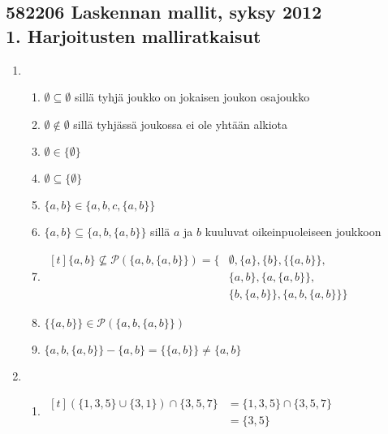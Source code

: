 \documentclass[a4paper,11pt,draft]{article}
\begin{document}
\subsection*{582206 Laskennan mallit, syksy 2012\\
1. Harjoitusten malliratkaisut}

\begin{enumerate}

\item
  \begin{enumerate}
  \item $\emptyset \subseteq \emptyset$ sillä tyhjä joukko on jokaisen
    joukon osajoukko
  \item $\emptyset \notin \emptyset$ sillä tyhjässä joukossa ei ole
    yhtään alkiota
  \item $\emptyset \in \{\emptyset\}$
  \item $\emptyset \subseteq \{\emptyset\}$
  \item $\{a,b\} \in \{a,b,c,\{a,b\}\}$
  \item $\{a,b\} \subseteq \{a,b,\{a,b\}\}$ sillä $a$ ja $b$ kuuluvat
    oikeinpuoleiseen joukkoon

  \item
    \begin{math}
      \begin{aligned}[t]
        \{a,b\} \not\subseteq \mathcal{P}(\{a,b,\{a,b\}\}) =
        \{&\emptyset, \{a\}, \{b\}, \{\{a,b\}\},\\
        &\{a, b\}, \{a, \{a, b\}\},\\
        &\{b, \{a, b\}\}, \{a, b, \{a, b\}\}\}
      \end{aligned}
    \end{math}

  \item $\{\{a,b\}\} \in \mathcal{P}(\{a,b,\{a,b\}\})$
  \item $\{a,b,\{a,b\}\} - \{a,b\}= \{\{a,b\}\} \neq \{a, b\}$
  \end{enumerate}

\item
  \begin{enumerate}
  \item
    \begin{math}
      \begin{aligned}[t]
        (\{1,3,5\} \cup \{3,1\}) \cap \{3,5,7\}
        &= \{1,3,5\} \cap \{3,5,7\} \\
        &= \{3,5\}
      \end{aligned}
    \end{math}


\end{enumerate}
\end{enumerate}
\end{document}
